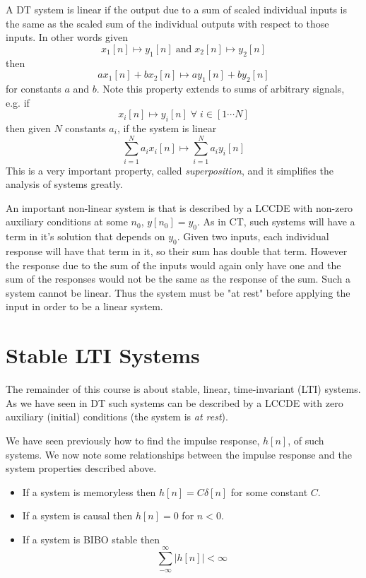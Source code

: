 A DT system is linear if the output due to a sum of scaled individual inputs is the same as the scaled sum of the individual outputs with respect to those inputs. In other words given
\[
x_1[n] \mapsto y_1[n] \;\text{and}\; x_2[n] \mapsto y_2[n]
\]
then
\[
a x_1[n] + b x_2[n] \mapsto a y_1[n] + b y_2[n]
\]
for constants $a$ and $b$.
Note this property extends to sums of arbitrary signals, e.g. if
\[
x_i[n] \mapsto y_i[n] \; \forall\; i \in [1 \cdots N]
\]
then given $N$ constants $a_i$, if the system is linear
\[
\sum\limits_{i = 1}^N a_i x_i[n] \mapsto \sum\limits_{i = 1}^N a_i y_i[n] 
\]
This is a very important property, called {\it superposition}, and it simplifies the analysis of systems greatly.

An important non-linear system is that is described by a LCCDE with non-zero auxiliary conditions at some $n_0$, $y[n_0] = y_0$. As in CT, such systems will have a term in it's solution that depends on $y_0$. Given two inputs, each individual response will have that term in it, so their sum has double that term. However the response due to the sum of the inputs would again only have one and the sum of the responses would not be the same as the response of the sum. Such a system cannot be linear. Thus the system must be "at rest" before applying the input in order to be a linear system.

\section{Stable LTI Systems}

The remainder of this course is about stable, linear, time-invariant (LTI) systems. As we have seen in DT such systems can be described by a LCCDE with zero auxiliary (initial) conditions (the system is \emph{at rest}). 

We have seen previously how to find the impulse response, $h[n]$, of such systems. We now note some relationships between the impulse response and the system properties described above.

\begin{itemize}
\item If a system is memoryless then $h[n] = C \delta[n]$ for some constant $C$.
\item If a system is causal then  $h[n] = 0$ for $n < 0$.
\item If a system is BIBO stable then
  \[
  \sum\limits_{-\infty}^{\infty} |h[n]| < \infty
  \]
\end{itemize}

